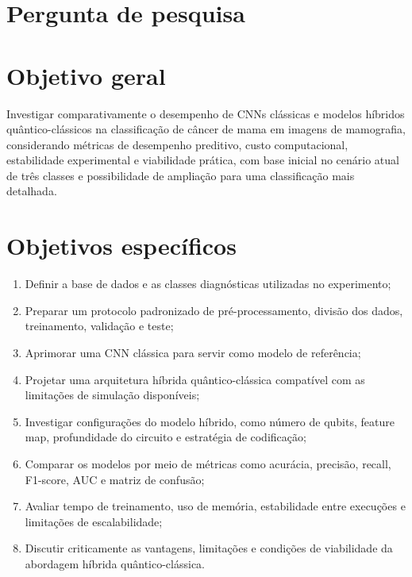 \documentclass[
    12pt,
    openright,
    oneside,
    a4paper,
    english,
    brazil
]{abntex2}
\begin{document}
\section{Pergunta de pesquisa}


\section{Objetivo geral}

Investigar comparativamente o desempenho de CNNs clássicas e modelos híbridos quântico-clássicos na classificação de câncer de mama em imagens de mamografia, considerando métricas de desempenho preditivo, custo computacional, estabilidade experimental e viabilidade prática, com base inicial no cenário atual de três classes e possibilidade de ampliação para uma classificação mais detalhada.


\section{Objetivos específicos}

\begin{enumerate} 
    \item Definir a base de dados e as classes diagnósticas utilizadas no experimento;
    \item Preparar um protocolo padronizado de pré-processamento, divisão dos dados, treinamento, validação e teste;
    \item Aprimorar uma CNN clássica para servir como modelo de referência;
    \item Projetar uma arquitetura híbrida quântico-clássica compatível com as limitações de simulação disponíveis;
    \item Investigar configurações do modelo híbrido, como número de qubits, feature map, profundidade do circuito e estratégia de codificação;
    \item Comparar os modelos por meio de métricas como acurácia, precisão, recall, F1-score, AUC e matriz de confusão;
    \item Avaliar tempo de treinamento, uso de memória, estabilidade entre execuções e limitações de escalabilidade;
    \item Discutir criticamente as vantagens, limitações e condições de viabilidade da abordagem híbrida quântico-clássica.
\end{enumerate}
\end{document}

